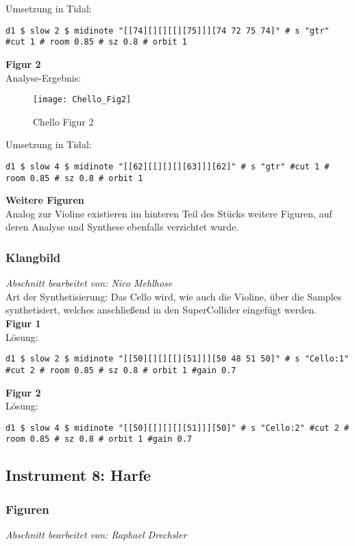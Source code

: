 \documentclass[
10pt, %
a4paper, %
oneside, %
headinclude,footinclude, %
BCOR5mm, %
]{scrartcl}
\begin{document}
\noindent Umsetzung in Tidal:
\begin{lstlisting}
d1 $ slow 2 $ midinote "[[74][][][[][75]]][74 72 75 74]" # s "gtr" #cut 1 # room 0.85 # sz 0.8 # orbit 1
\end{lstlisting}

\noindent\textbf{Figur 2}\\
Analyse-Ergebnis:
\begin{figure}[h]
	\centering 
	\texttt{[image: Chello\_Fig2]} 
	\caption{Chello Figur 2}
\end{figure}

\noindent Umsetzung in Tidal:
\begin{lstlisting}
d1 $ slow 4 $ midinote "[[62][[][][][63]]][62]" # s "gtr" #cut 1 # room 0.85 # sz 0.8 # orbit 1
\end{lstlisting}

\noindent\textbf{Weitere Figuren}\\
Analog zur Violine existieren im hinteren Teil des Stücks weitere Figuren, auf deren Analyse und Synthese ebenfalls verzichtet wurde.

\subsubsection{Klangbild}
\textit{Abschnitt bearbeitet von: Nico Mehlhose}\\

\noindent 
Art der Synthetisierung: Das Cello wird, wie auch die Violine, über die Samples synthetisiert\cite{Orch}, welches anschließend in den SuperCollider eingefügt werden.\\

\noindent\textbf{Figur 1}\\
Lösung:
\begin{lstlisting}
d1 $ slow 2 $ midinote "[[50][][][[][51]]][50 48 51 50]" # s "Cello:1" #cut 2 # room 0.85 # sz 0.8 # orbit 1 #gain 0.7
\end{lstlisting}
\noindent\textbf{Figur 2}\\
Lösung:
\begin{lstlisting}
d1 $ slow 4 $ midinote "[[50][[][][][51]]][50]" # s "Cello:2" #cut 2 # room 0.85 # sz 0.8 # orbit 1 #gain 0.7
\end{lstlisting}

\subsection{Instrument 8: Harfe}
\subsubsection{Figuren}
\textit{Abschnitt bearbeitet von: Raphael Drechsler}\\
\end{document}
